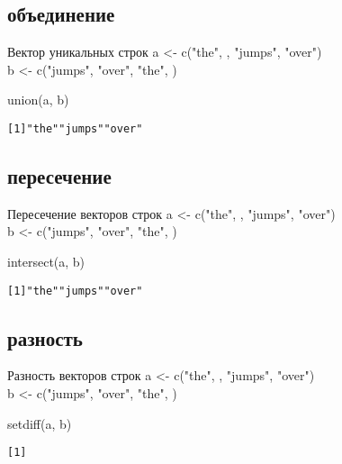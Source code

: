 \subsection{объединение}
\begin{frame}[fragile]{Вектор уникальных строк}
a <- c("the"{}, {}, "jumps"{}, "over"{})\\
b <- c("jumps"{}, "over"{}, "the"{}, {})
\begin{itemize}
\mytem union(a, b)
\footnotesize
\begin{alltt}
[1] "the"{ }{}{ }"jumps"{ }"over"{ }{}  
\end{alltt}
\normalsize
\end{itemize}
\end{frame}
\subsection{пересечение}
\begin{frame}[fragile]{Пересечение векторов строк}
a <- c("the"{}, {}, "jumps"{}, "over"{})\\
b <- c("jumps"{}, "over"{}, "the"{}, {})
\begin{itemize}
\mytem intersect(a, b)
\footnotesize
\begin{alltt}
[1] "the"{ }"jumps"{ }"over"
\end{alltt}
\normalsize
\end{itemize}
\end{frame}
\subsection{разность}
\begin{frame}[fragile]{Разность векторов строк}
a <- c("the"{}, {}, "jumps"{}, "over"{})\\
b <- c("jumps"{}, "over"{}, "the"{}, {})
\begin{itemize}
\mytem setdiff(a, b)
\footnotesize
\begin{alltt}
[1] {}
\end{alltt}
\normalsize
\end{itemize}
\end{frame}
